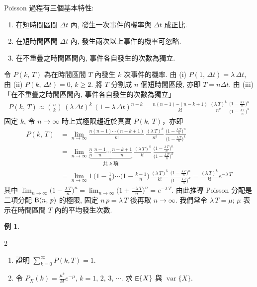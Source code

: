 \documentclass[12pt]{extarticle}
\newcommand{\ds}{\displaystyle}
\DeclareMathOperator\expc{{\sf E}}
\DeclareMathOperator\var{var}
\theoremstyle{definition}
\newtheorem*{ex}{例}
\newcommand{\myline}{\noindent\makebox[\linewidth]{\rule{\paperwidth}{0.4pt}}}
\begin{document}
\bigskip
\noindent Poisson 過程有三個基本特性: 
\begin{enumerate}[label=(\roman*)]\setlength{\itemsep}{0pt}
  \item 在短時間區間 $\Delta t$ 內, 發生一次事件的機率與 $\Delta t$ 成正比. 
  \item 在短時間區間 $\Delta t$ 內, 發生兩次以上事件的機率可忽略. 
  \item 在不重疊之時間區間內, 事件各自發生的次數為獨立. 
\end{enumerate}
令 $\ds P(k,\,T)$ 為在時間區間 $T$ 內發生 $k$ 次事件的機率. 由 (i) $\ds P(1,\,\Delta t) = \lambda\,\Delta t$, 由 (ii) $\ds P(k,\,\Delta t) = 0$, $k\geqslant 2$. 將 $T$ 分割成 $n$ 個短時間區段, 亦即 $\ds T = n\Delta t$. 由 (iii) 「在不重疊之時間區間內, 事件各自發生的次數為獨立」 
\begin{align*}
  P(k,\,T) \approx \binom{n}{k}\,(\lambda\,\Delta t)^k\,(1 - \lambda\,\Delta t)^{n - k} = \frac{n(n - 1)\cdots(n - k + 1)}{k!}\,\frac{(\lambda\,T)^k}{n^k}\,\frac{\big(1 - \frac{\lambda\,T}{n}\big)^n}{\big(1 - \frac{\lambda\,T}{n}\big)^k}
\end{align*}
固定 $k$, 令 $n\to\infty$ 時上式極限趨近於真實 $\ds P(k,\,T)$，亦即
\begin{align*}
  P(k,\,T) &= \lim_{n\to\infty}\frac{n(n - 1)\cdots(n - k + 1)}{k!}\,\frac{(\lambda\,T)^k}{n^k}\,\frac{\big(1 - \frac{\lambda\,T}{n}\big)^n}{\big(1 - \frac{\lambda\,T}{n}\big)^k} \\
  &= \lim_{n\to\infty}\underbrace{\frac{n}{n}\,\frac{n - 1}{n}\cdots\frac{n - k + 1}{n}}_{\text{共 $k$ 項}}\,\frac{(\lambda\,T)^k}{k!}\,\frac{\big(1 - \frac{\lambda\,T}{n}\big)^n}{\big(1 - \frac{\lambda\,T}{n}\big)^k} \\
  &= \lim_{n\to\infty}1\,\Big(1 - \frac{1}{n}\Big)\cdots\Big(1 - \frac{k - 1}{n}\Big)\,\frac{(\lambda\,T)^k}{k!}\,\frac{\big(1 - \frac{\lambda\,T}{n}\big)^n}{\big(1 - \frac{\lambda\,T}{n}\big)^k} = \frac{(\lambda\,T)^k}{k!}e^{-\lambda\,T}
\end{align*}
其中 $\ds\lim_{n\to\infty}\Big(1 - \frac{\lambda\,T}{n}\Big)^n = \lim_{n\to\infty}\Big(1 + \frac{-\lambda\,T}{n}\Big)^n = e^{-\lambda\,T}$. 由此推導 Poisson 分配是二項分配 ${\sf B}(n,\,p)$ 的極限, 固定 $n\,p = \lambda\,T$ 後再取 $n\to\infty$. 我們常令 $\lambda\,T = \mu$; $\mu$ 表示在時間區間 $T$ 內的平均發生次數. 

\myline

\begin{ex}
  \setlength{\columnsep}{-5cm}
  \begin{multicols}{2}
    \begin{enumerate}[label=(\alph*)]\setlength{\itemsep}{0pt}
      \item 證明 $\ds\sum_{k = 0}^{\infty} P(k,T) = 1$.
      \item 令 $\ds P_X(k) = \frac{\mu^k}{k!}e^{-\mu}$, $k = 1,\,2,\,3,\,\cdots$. 求 $\expc\{X\}$ 與 $\var\{X\}$.
    \end{enumerate}
  \end{multicols}
\end{ex}
\end{document}
